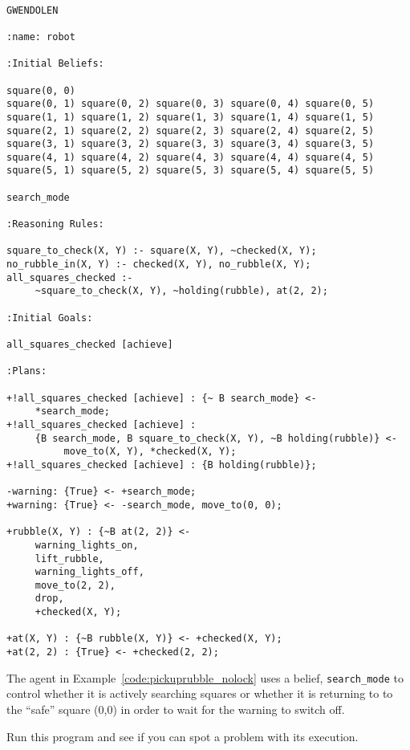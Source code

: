 \begin{ourexample}
\label{code:pickuprubble_nolock} \quad \\
\begin{lstlisting}[basicstyle=\sffamily,style=easslisting,language=Gwendolen]
GWENDOLEN

:name: robot

:Initial Beliefs:

square(0, 0) 
square(0, 1) square(0, 2) square(0, 3) square(0, 4) square(0, 5)
square(1, 1) square(1, 2) square(1, 3) square(1, 4) square(1, 5)
square(2, 1) square(2, 2) square(2, 3) square(2, 4) square(2, 5)
square(3, 1) square(3, 2) square(3, 3) square(3, 4) square(3, 5)
square(4, 1) square(4, 2) square(4, 3) square(4, 4) square(4, 5)
square(5, 1) square(5, 2) square(5, 3) square(5, 4) square(5, 5)

search_mode

:Reasoning Rules:

square_to_check(X, Y) :- square(X, Y), ~checked(X, Y);
no_rubble_in(X, Y) :- checked(X, Y), no_rubble(X, Y);
all_squares_checked :- 
     ~square_to_check(X, Y), ~holding(rubble), at(2, 2);

:Initial Goals:

all_squares_checked [achieve]

:Plans:

+!all_squares_checked [achieve] : {~ B search_mode} <- 
     *search_mode;
+!all_squares_checked [achieve] : 
     {B search_mode, B square_to_check(X, Y), ~B holding(rubble)} <- 
          move_to(X, Y), *checked(X, Y);
+!all_squares_checked [achieve] : {B holding(rubble)};

-warning: {True} <- +search_mode;
+warning: {True} <- -search_mode, move_to(0, 0);

+rubble(X, Y) : {~B at(2, 2)} <- 
     warning_lights_on, 
     lift_rubble, 
     warning_lights_off, 
     move_to(2, 2), 
     drop, 
     +checked(X, Y);

+at(X, Y) : {~B rubble(X, Y)} <- +checked(X, Y);
+at(2, 2) : {True} <- +checked(2, 2);
\end{lstlisting}
\end{ourexample}
The agent in Example~\ref{code:pickuprubble_nolock} uses a belief, \lstinline{search_mode} to control whether it is actively searching squares or whether it is returning to to the ``safe'' square (0,0) in order to wait for the warning to switch off.  

Run this program and see if you can spot a problem with its execution.

